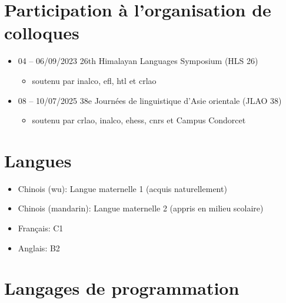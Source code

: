 \documentclass[french]{../crudecv/crudecv}
\begin{document}
\section*{Participation à l'organisation de colloques}
\begin{itemize}
  \item 04 -- 06/09/2023 \hspace{5pt} 26th Himalayan Languages Symposium (HLS 26)
  \begin{itemize}
    \item soutenu par \gls*{inalco}, \gls*{efl}, \gls*{htl} et \gls*{crlao}
  \end{itemize}
  \item 08 -- 10/07/2025 \hspace{5pt} 38e Journées de linguistique d'Asie orientale (JLAO 38)
  \begin{itemize}
    \item soutenu par \gls*{crlao}, \gls*{inalco}, \gls*{ehess}, \gls*{cnrs} et Campus Condorcet
  \end{itemize}
\end{itemize}

\section*{Langues}
\begin{itemize}
\item Chinois (wu): Langue maternelle 1 (acquis naturellement)
\item Chinois (mandarin): Langue maternelle 2 (appris en milieu scolaire)
\item Français: C1
\item Anglais: B2
\end{itemize}

\section*{Langages de programmation}
\begin{skills}
\end{skills}

\end{document}
